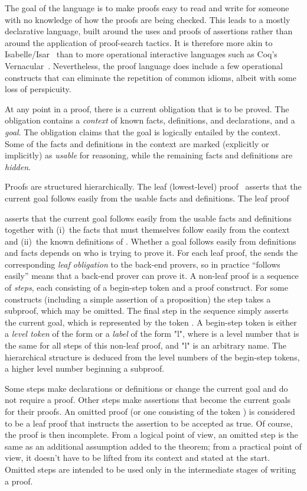 \documentclass[a4paper]{easychair}
\begin{document}
The goal of the language is to make proofs easy to read and write for
someone with no knowledge of how the proofs are being checked.  This
leads to a mostly declarative language, built around the uses and
proofs of assertions rather than around the application of
proof-search tactics.  It is therefore more akin to
Isabelle/Isar~\cite{isar} than to more operational interactive
languages such as Coq's Vernacular~\cite{coq}.
Nevertheless, the proof language does include a few operational
constructs that can eliminate the repetition of common idioms, albeit
with some loss of perspicuity.


At any point in a \tlaplus proof, there is a current obligation that
is to be proved.  The obligation contains a \emph{context} of known
facts, definitions, and declarations, and a \emph{goal}.
The obligation claims that the goal is logically entailed by the
context.  Some of the facts and definitions in the context are marked
(explicitly or implicitly) as \emph{usable} for reasoning, while the
remaining facts and definitions are \textit{hidden}.

Proofs are structured hierarchically. The leaf (lowest-level) proof
\OBVIOUS\ asserts that the current goal follows easily from the usable
facts and definitions.  The leaf proof

asserts that the current goal follows easily from the usable facts and
definitions together with (i)~the facts  that must themselves
follow easily from the context and (ii)~the known definitions of
.  Whether a goal follows easily from definitions and facts
depends on who is trying to prove it.  For each leaf proof,
the \PM sends the corresponding \emph{leaf obligation} 
to the back-end provers, so in practice ``follows easily''
means that a back-end prover can prove it.
A non-leaf proof is a sequence of \textit{steps}, each consisting of a
begin-step token and a proof construct.  For some constructs
(including a simple assertion of a proposition) the step takes a
subproof, which may be omitted.  The final step in the sequence simply
asserts the current goal, which is represented by the token \QED.
A begin-step token is either a \emph{level token} of the form  or
a \emph{label} of the form "l", where  is a level number that
is the same for all steps of this non-leaf proof, and "l" is an
arbitrary name.  The hierarchical structure is deduced from the level
numbers of the begin-step tokens, a higher level number beginning a
subproof.

Some steps make declarations or definitions or change the current goal
and do not require a proof.  Other steps make assertions that become
the current goals for their proofs.  An omitted proof (or one
consisting of the token \OMITTED) is considered to be a leaf proof
that instructs the assertion to be accepted as true.  Of course, the
proof is then incomplete.  From a logical point of view, an omitted
step is the same as an additional assumption added to the theorem;
from a practical point of view, it doesn't have to be lifted from its
context and stated at the start.  Omitted steps are intended to be
used only in the intermediate stages of writing a proof.
\end{document}

